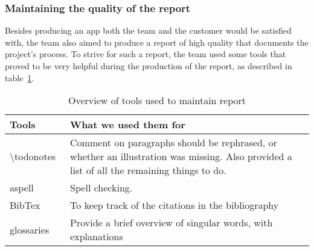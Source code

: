 \subsubsection{Maintaining the quality of the report}
Besides producing an app both the team and the customer would be satisfied with, the team also aimed to produce a report of high quality that documents the project's process. To strive for such a report, the team used some tools that proved to be very helpful during the production of the report, as described in table~\ref{tab:reportTools}.

\begin{table}[H]
\begin{tabular}{|l|p{13.7cm}|}
\hline
\textbf{Tools} & \textbf{What we used them for}\\\hline
\textbackslash todonotes~\cite{todo}&Comment on paragraphs should be rephrased, or whether an illustration was missing. Also provided a list of all the remaining things to do.\\\hline
aspell~\cite{aspell} & Spell checking.\\\hline
BibTex~\cite{bibtex}&To keep track of the citations in the bibliography\\\hline
glossaries~\cite{glossaries}& Provide a brief overview of singular words, with explanations\\\hline
\end{tabular}
\caption{Overview of tools used to maintain report}
\label{tab:reportTools}
\end{table}

\begin{comment}
\subsubsection{\textbackslash todonotes}
Feedback is key when creating a product. The \textbackslash todonotes~\cite{todo} package allowed the team to comment on paragraphs and formulations we wanted to rephrase, whether an illustration was missing, and also gave us a list of all the things we had to do, making it easy to get an overview of the remaining tasks regarding the report.\\

\subsubsection{Spell checking: aspell}
Although manual proofreading cannot be avoided, it is advantageous to have a tool to perform automatic spell checking. Aspell~\cite{aspell} is such a tool.\\

\subsubsection{References and glossary}
To keep track of the citations in the bibliography in the report, we used a LaTeX-package called BibTex~\cite{bibtex}, and for our glossaries, a package called glossaries~\cite{glossaries}.

\end{comment}

